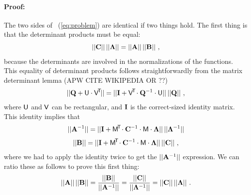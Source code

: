 \paragraph{Proof:}
The two sides of \equationname~(\ref{eq:problem}) are identical if two things
hold.
The first thing is that the determinant products must be equal:
\begin{equation}
||\mathbf{C}||\,||\mathbf{\Lambda}|| = ||\mathbf{A}||\,||\mathbf{B}||
~,
\end{equation}
because the determinants are involved in the normalizations of the
functions.
This equality of determinant products follows straightforwardly from
the matrix determinant lemma (APW CITE WIKIPEDIA OR ??)
\begin{equation}\label{eq:detlemma}
||\mathbf{Q} + \mathsf{U}\cdot\mathsf{V}^{\!\mathsf{T}\!}|| = ||\mathbf{I} + \mathsf{V}^{\!\mathsf{T}\!}\cdot\mathbf{Q}^{-1}\cdot\mathsf{U}||\,||\mathbf{Q}||
~,
\end{equation}
where $\mathsf{U}$ and $\mathsf{V}$ can be rectangular, and $\mathbf{I}$ is the correct-sized identity matrix.
This identity implies that
\begin{equation}
||\mathbf{A}^{-1}|| = ||\mathbf{I} + \mathsf{M}^{\!\mathsf{T}\!}\cdot\mathbf{C}^{-1}\cdot\mathsf{M}\cdot\mathbf{\Lambda}||\,||\mathbf{\Lambda}^{-1}||
\end{equation}
\begin{equation}
||\mathbf{B}||     = ||\mathbf{I} + \mathsf{M}^{\!\mathsf{T}\!}\cdot\mathbf{C}^{-1}\cdot\mathsf{M}\cdot\mathbf{\Lambda}||\,||\mathbf{C}||
~,
\end{equation}
where we had to apply the identity twice to get the $||\mathbf{A}^{-1}||$ expression.
We can ratio these as follows to prove this first thing:
\begin{equation}
||\mathbf{A}||\,||\mathbf{B}||
 = \frac{||\mathbf{B}||}{||\mathbf{A}^{-1}||}
 = \frac{||\mathbf{C}||}{||\mathbf{\Lambda}^{-1}||}
 = ||\mathbf{C}||\,||\mathbf{\Lambda}||
~.
\end{equation}

